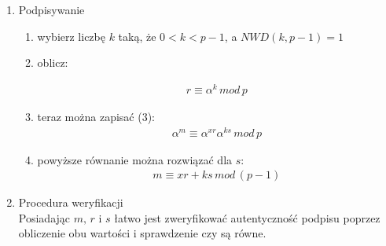 \documentclass[12pt,a4paper]{article}
\begin{document}
\begin{enumerate}
    \item Podpisywanie\\
    \begin{enumerate}
        \item wybierz liczbę $k$ taką, że $0<k<p-1$, a $NWD(k,p-1) = 1$
        \item oblicz: 
            
            \begin{gather}
                r \equiv \alpha^{k}\,mod\,p
                \end{gather}
            
        
        \item teraz można zapisać (3): 
        \begin{gather}
            \alpha^{m} \equiv \alpha^{xr}\alpha^{ks}\,mod\,p
        \end{gather}
        
        \item powyższe równanie można rozwiązać dla $s$:
        \begin{gather}
            m \equiv xr + ks\,mod\,(p-1)
        \end{gather}
        
    \end{enumerate}
    \item Procedura weryfikacji\\
    Posiadając $m, \,r$ i $ s$ łatwo jest zweryfikować autentyczność podpisu poprzez obliczenie obu wartości i sprawdzenie czy są równe.
\end{enumerate}
\end{document}
